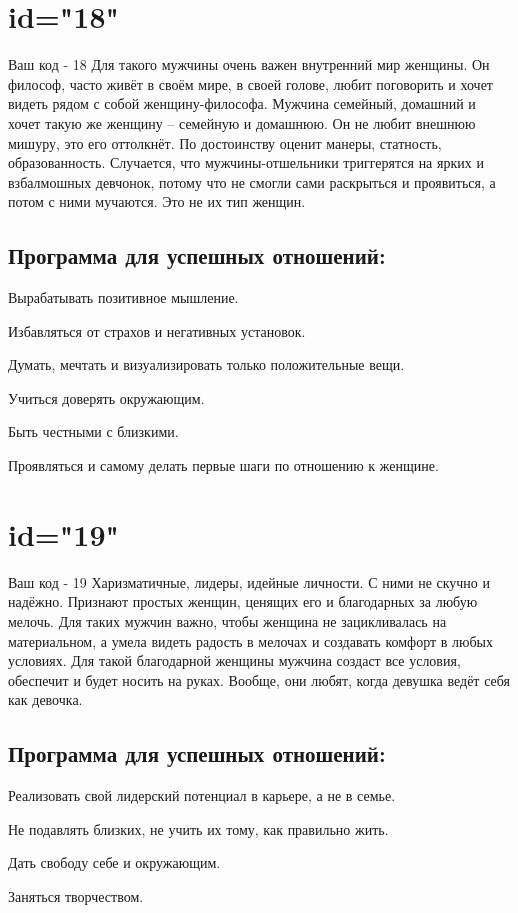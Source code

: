 \section{id="18"}{Ваш код - 18}
Для такого мужчины очень важен внутренний мир женщины. Он философ, 
часто живёт в своём мире, в своей голове, любит поговорить и хочет 
видеть рядом с собой женщину-философа. Мужчина семейный, домашний 
и хочет такую же женщину – семейную и домашнюю. Он не любит внешнюю 
мишуру, это его оттолкнёт. По достоинству оценит манеры, статность, 
образованность. Случается, что мужчины-отшельники триггерятся на 
ярких и взбалмошных девчонок, потому что не смогли сами раскрыться 
и проявиться, а потом с ними мучаются. Это не их тип женщин.
\subsection{Программа для успешных отношений:}
\item Вырабатывать позитивное мышление.
\item Избавляться от страхов и негативных установок.
\item Думать, мечтать и визуализировать только положительные вещи.
\item Учиться доверять окружающим.
\item Быть честными с близкими.
\item Проявляться и самому делать первые шаги по отношению к женщине.
\endsubsection
\endsection

\section{id="19"}{Ваш код - 19}
Харизматичные, лидеры, идейные личности. С ними не скучно и надёжно. 
Признают простых женщин, ценящих его и благодарных за любую мелочь. 
Для таких мужчин важно, чтобы женщина не зацикливалась на материальном, 
а умела видеть радость в мелочах и создавать комфорт в любых условиях. 
Для такой благодарной женщины мужчина создаст все условия, обеспечит 
и будет носить на руках. Вообще, они любят, когда девушка ведёт себя 
как девочка.
\subsection{Программа для успешных отношений:}
\item Реализовать свой лидерский потенциал в карьере, а не в семье.
\item Не подавлять близких, не учить их тому, как правильно жить.
\item Дать свободу себе и окружающим.
\item Заняться творчеством.
\endsubsection
\endsection

